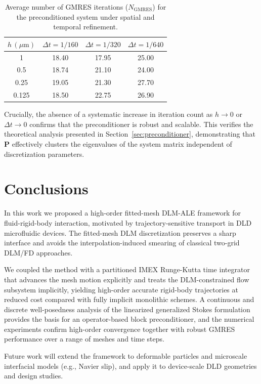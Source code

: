 \documentclass{article}
\begin{document}
\begin{table}[htbp]
\centering
\caption{Average number of GMRES iterations ($N_{\text{GMRES}}$) for the preconditioned system under spatial and temporal refinement.}
\label{tab:gmres_refinement}
\begin{tabular}{c S[table-format=2.2] S[table-format=2.2] S[table-format=2.2]}
\toprule
{$h\,(\mu\mathrm{m})$}  & {$\Delta t = 1/160$}  & {$\Delta t = 1/320$}& {$\Delta t = 1/640$}\\
      & 18.40  & 17.95  & 25.00\\
0.5    & 18.74  & 21.10  & 24.00\\
0.25   & 19.05  & 21.30  & 27.70\\
0.125  & 18.50  & 22.75  & 26.90\\
\bottomrule
\end{tabular}
\end{table}



Crucially, the absence of a systematic increase in iteration count as $h \to 0$ or $\Delta t \to 0$ confirms that the preconditioner is robust and scalable. This verifies the theoretical analysis presented in Section~\ref{sec:preconditioner}, demonstrating that $\mathbf{P}$ effectively clusters the eigenvalues of the system matrix independent of discretization parameters.



\section{Conclusions}
In this work we proposed a high-order fitted-mesh DLM-ALE framework for fluid-rigid-body interaction, motivated by trajectory-sensitive transport in DLD microfluidic devices. The fitted-mesh DLM discretization preserves a sharp interface and avoids the interpolation-induced smearing of classical two-grid DLM/FD approaches.

We coupled the method with a partitioned IMEX Runge-Kutta time integrator that advances the mesh motion explicitly and treats the DLM-constrained flow subsystem implicitly, yielding high-order accurate rigid-body trajectories at reduced cost compared with fully implicit monolithic schemes. A continuous and discrete well-posedness analysis of the linearized generalized Stokes formulation provides the basis for an operator-based block preconditioner, and the numerical experiments confirm high-order convergence together with robust GMRES performance over a range of meshes and time steps.

Future work will extend the framework to deformable particles and microscale interfacial models (e.g., Navier slip), and apply it to device-scale DLD geometries and design studies.



\end{document}
